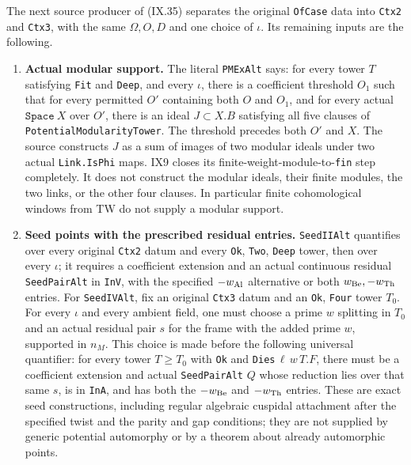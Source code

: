 The next source producer of (IX.35) separates
the original \texttt{OfCase} data into
\texttt{Ctx2} and \texttt{Ctx3}, with the same
$\Omega,O,D$ and one choice of $\iota$.
Its remaining inputs are the following.
\begin{enumerate}
\item \textbf{Actual modular support.}
The literal \texttt{PMExAlt} says: for every tower
$T$ satisfying \texttt{Fit} and \texttt{Deep}, and
every $\iota$, there is a coefficient threshold
$O_1$ such that for every permitted $O'$
containing both $O$ and $O_1$, and for every actual
$\texttt{Space}\ X$ over $O'$, there is an ideal
$J\subset X.B$ satisfying all five clauses of
\texttt{PotentialModularityTower}.
The threshold precedes both $O'$ and $X$.
The source constructs $J$ as a sum of images of
two modular ideals under two actual
\texttt{Link.IsPhi} maps.  IX9 closes its
finite-weight-module-to-\texttt{fin} step completely.
It does not construct the modular ideals, their
finite modules, the two links, or the other four
clauses.  In particular finite cohomological
windows from TW do not supply a modular support.

\item \textbf{Seed points with the prescribed residual entries.}
\texttt{SeedIIAlt} quantifies over every original
\texttt{Ctx2} datum and every
\texttt{Ok}, \texttt{Two}, \texttt{Deep} tower,
then over every $\iota$; it requires a coefficient
extension and an actual continuous residual
\texttt{SeedPairAlt} in \texttt{InV}, with the
specified $-w_{\rm Al}$ alternative or both
$w_{\rm Be},-w_{\rm Th}$ entries.
For \texttt{SeedIVAlt}, fix an original
\texttt{Ctx3} datum and an \texttt{Ok}, \texttt{Four}
tower $T_0$.  For every $\iota$ and every ambient
field, one must choose a prime $w$ splitting in
$T_0$ and an actual residual pair $s$ for the
frame with the added prime $w$, supported in
$n_M$.  This choice is made before the following
universal quantifier: for every tower $T\ge T_0$
with \texttt{Ok} and \texttt{Dies}$\,\ell\,w\,T.F$,
there must be a coefficient extension and actual
\texttt{SeedPairAlt} $Q$ whose reduction lies over
that same $s$, is in \texttt{InA}, and has both
the $-w_{\rm Be}$ and $-w_{\rm Th}$ entries.
These are exact seed constructions, including
regular algebraic cuspidal attachment after the
specified twist and the parity and gap conditions;
they are not supplied by generic potential
automorphy or by a theorem about already
automorphic points.


\end{enumerate}
